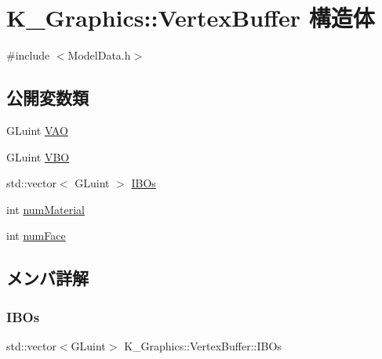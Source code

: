 \hypertarget{struct_k___graphics_1_1_vertex_buffer}{}\section{K\+\_\+\+Graphics\+:\+:Vertex\+Buffer 構造体}
\label{struct_k___graphics_1_1_vertex_buffer}


{\ttfamily \#include $<$Model\+Data.\+h$>$}

\subsection*{公開変数類}
\begin{DoxyCompactItemize}
\item 
G\+Luint \mbox{\hyperlink{struct_k___graphics_1_1_vertex_buffer_afd09e4c86923eb440f57c6c03399ff4a}{V\+AO}}
\item 
G\+Luint \mbox{\hyperlink{struct_k___graphics_1_1_vertex_buffer_a9c2de7f12d4bf0b6d17752bc8b056188}{V\+BO}}
\item 
std\+::vector$<$ G\+Luint $>$ \mbox{\hyperlink{struct_k___graphics_1_1_vertex_buffer_a3045b55024ba41ed3ae79986ba536b7c}{I\+B\+Os}}
\item 
int \mbox{\hyperlink{struct_k___graphics_1_1_vertex_buffer_a5f37667aa860c77b93e40b9502a53235}{num\+Material}}
\item 
int \mbox{\hyperlink{struct_k___graphics_1_1_vertex_buffer_a9eb5f2ce9a42bc8e223493919e27e26f}{num\+Face}}
\end{DoxyCompactItemize}


\subsection{メンバ詳解}
\mbox{\label{struct_k___graphics_1_1_vertex_buffer_a3045b55024ba41ed3ae79986ba536b7c}} 
\subsubsection{\texorpdfstring{I\+B\+Os}{IBOs}}
{\footnotesize\ttfamily std\+::vector$<$G\+Luint$>$ K\+\_\+\+Graphics\+::\+Vertex\+Buffer\+::\+I\+B\+Os}

